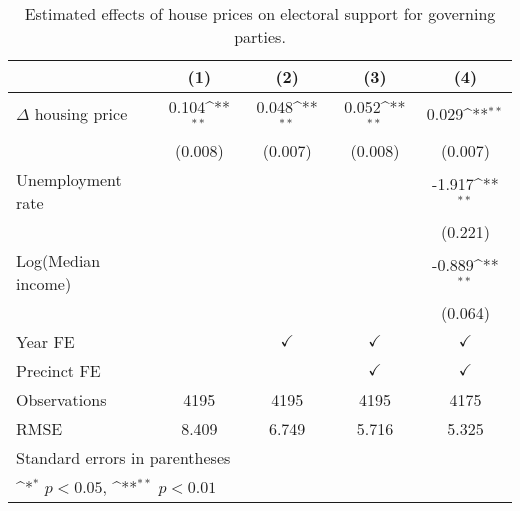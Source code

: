 \begin{table}[htbp]\centering
\def\sym#1{\ifmmode^{#1}\else\(^{#1}\)\fi}
\caption{Estimated effects of house prices on electoral support for governing parties.} \label{predv}
\begin{tabular}{l*{4}{c}}
\hline\hline
                    &\multicolumn{1}{c}{(1)}        &\multicolumn{1}{c}{(2)}        &\multicolumn{1}{c}{(3)}        &\multicolumn{1}{c}{(4)}        \\
\hline
$\Delta$ housing price&       0.104\sym{**}&       0.048\sym{**}&       0.052\sym{**}&       0.029\sym{**}\\
                    &     (0.008)        &     (0.007)        &     (0.008)        &     (0.007)        \\
[1em]
Unemployment rate   &                    &                    &                    &      -1.917\sym{**}\\
                    &                    &                    &                    &     (0.221)        \\
[1em]
Log(Median income)  &                    &                    &                    &      -0.889\sym{**}\\
                    &                    &                    &                    &     (0.064)        \\
[1em]
\hline Year FE      &                    &$\checkmark$        &$\checkmark$        &$\checkmark$        \\
[1em]
Precinct FE         &                    &                    &$\checkmark$        &$\checkmark$        \\
\hline
Observations        &        4195        &        4195        &        4195        &        4175        \\
RMSE                &       8.409        &       6.749        &       5.716        &       5.325        \\
\hline\hline
\multicolumn{5}{l}{\footnotesize Standard errors in parentheses}\\
\multicolumn{5}{l}{\footnotesize \sym{*} \(p<0.05\), \sym{**} \(p<0.01\)}\\
\end{tabular}
\end{table}
